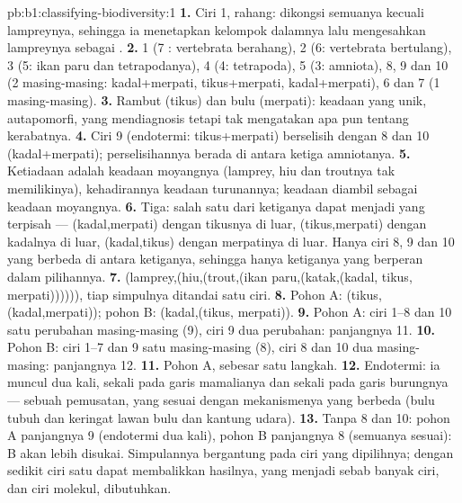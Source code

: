 \begin{solution}{pb:b1:classifying-biodiversity:1}
\textbf{1.} Ciri 1, rahang: dikongsi semuanya kecuali lampreynya,
sehingga ia menetapkan kelompok dalamnya lalu mengesahkan lampreynya
sebagai .
\textbf{2.} 1 (7 : vertebrata berahang), 2 (6: vertebrata
bertulang), 3 (5: ikan paru dan tetrapodanya), 4 (4: tetrapoda), 5 (3:
amniota), 8, 9 dan 10 (2 masing-masing: kadal+merpati, tikus+merpati,
kadal+merpati), 6 dan 7 (1 masing-masing).
\textbf{3.} Rambut (tikus) dan bulu (merpati): keadaan yang unik,
autapomorfi, yang mendiagnosis  tetapi tak mengatakan apa pun
tentang kerabatnya.
\textbf{4.} Ciri 9 (endotermi: tikus+merpati) berselisih dengan 8 dan
10 (kadal+merpati); perselisihannya berada di antara ketiga amniotanya.
\textbf{5.} Ketiadaan  adalah keadaan moyangnya (lamprey, hiu
dan troutnya tak memilikinya), kehadirannya keadaan turunannya;
keadaan  diambil sebagai keadaan moyangnya.
\textbf{6.} Tiga: salah satu dari ketiganya dapat menjadi yang
terpisah --- (kadal,merpati) dengan tikusnya di luar,
(tikus,merpati) dengan kadalnya di luar, (kadal,tikus) dengan
merpatinya di luar. Hanya ciri 8, 9 dan 10 yang berbeda di antara
ketiganya, sehingga hanya ketiganya yang berperan dalam pilihannya.
\textbf{7.} (lamprey,(hiu,(trout,(ikan paru,(katak,(kadal, tikus,
merpati)))))), tiap simpulnya ditandai satu ciri.
\textbf{8.} Pohon A: (tikus,(kadal,merpati)); pohon B: (kadal,(tikus,
merpati)).
\textbf{9.} Pohon A: ciri 1--8 dan 10 satu perubahan masing-masing (9),
ciri 9 dua perubahan: panjangnya \num{11}.
\textbf{10.} Pohon B: ciri 1--7 dan 9 satu masing-masing (8), ciri 8 dan
10 dua masing-masing: panjangnya \num{12}.
\textbf{11.} Pohon A, sebesar satu langkah.
\textbf{12.} Endotermi: ia muncul dua kali, sekali pada garis
mamalianya dan sekali pada garis burungnya --- sebuah pemusatan, yang
sesuai dengan mekanismenya yang berbeda (bulu tubuh dan keringat lawan
bulu dan kantung udara).
\textbf{13.} Tanpa 8 dan 10: pohon A panjangnya 9 (endotermi dua kali),
pohon B panjangnya 8 (semuanya sesuai): B akan lebih disukai.
Simpulannya bergantung pada ciri yang dipilihnya; dengan sedikit ciri
satu  dapat membalikkan hasilnya, yang menjadi sebab banyak
ciri, dan ciri molekul, dibutuhkan.

\end{solution}
